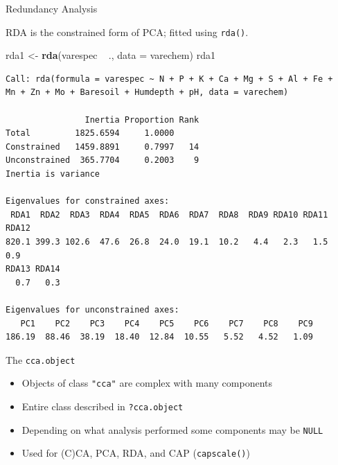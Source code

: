 \documentclass[10pt,ignorenonframetext,compress, aspectratio=169]{beamer}
\newenvironment{Shaded}{\begin{snugshade}}{\end{snugshade}}
\newcommand{\KeywordTok}[1]{\textcolor[rgb]{0.13,0.29,0.53}{\textbf{{#1}}}}
\newcommand{\DataTypeTok}[1]{\textcolor[rgb]{0.13,0.29,0.53}{{#1}}}
\newcommand{\StringTok}[1]{\textcolor[rgb]{0.31,0.60,0.02}{{#1}}}
\newcommand{\NormalTok}[1]{{#1}}
\begin{document}
\begin{frame}[fragile]{Redundancy Analysis}

RDA is the constrained form of PCA; fitted using \texttt{rda()}.

\tiny

\begin{Shaded}
\begin{Highlighting}[]
\NormalTok{rda1 <-}\StringTok{ }\KeywordTok{rda}\NormalTok{(varespec ~}\StringTok{ }\NormalTok{., }\DataTypeTok{data =} \NormalTok{varechem)}
\NormalTok{rda1}
\end{Highlighting}
\end{Shaded}

\begin{verbatim}
Call: rda(formula = varespec ~ N + P + K + Ca + Mg + S + Al + Fe +
Mn + Zn + Mo + Baresoil + Humdepth + pH, data = varechem)

                Inertia Proportion Rank
Total         1825.6594     1.0000     
Constrained   1459.8891     0.7997   14
Unconstrained  365.7704     0.2003    9
Inertia is variance 

Eigenvalues for constrained axes:
 RDA1  RDA2  RDA3  RDA4  RDA5  RDA6  RDA7  RDA8  RDA9 RDA10 RDA11 RDA12 
820.1 399.3 102.6  47.6  26.8  24.0  19.1  10.2   4.4   2.3   1.5   0.9 
RDA13 RDA14 
  0.7   0.3 

Eigenvalues for unconstrained axes:
   PC1    PC2    PC3    PC4    PC5    PC6    PC7    PC8    PC9 
186.19  88.46  38.19  18.40  12.84  10.55   5.52   4.52   1.09 
\end{verbatim}

\normalsize

\end{frame}

\begin{frame}{The \texttt{cca.object}}

\begin{itemize}
\itemsep1pt\parskip0pt
\item
  Objects of class \texttt{"cca"} are complex with many components
\item
  Entire class described in \texttt{?cca.object}
\item
  Depending on what analysis performed some components may be
  \texttt{NULL}
\item
  Used for (C)CA, PCA, RDA, and CAP (\texttt{capscale()})
\end{itemize}

\end{frame}
\end{document}
